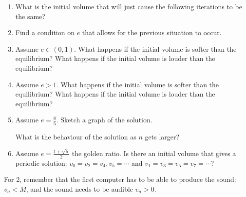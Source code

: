 \begin{exercises}
\begin{problist}
	\begin{enumerate}
		\item What is the initial volume that will just cause the following iterations to be the same?


		\item Find a condition on $e$ that allows for the previous situation to occur.


		\item Assume $e \in (0,1)$. What happens if the initial volume is softer than the equilibrium? What happens if the initial volume is louder than the equilibrium?
		\item Assume $e>1$. What happens if the initial volume is softer than the equilibrium? What happens if the initial volume is louder than the equilibrium?

		\item Assume $e=\frac85$. Sketch a graph of the solution.
		

		What is the behaviour of the solution as $n$ gets larger?
		
		\item Assume $e=\frac{1+\sqrt{5}}{2}$ the golden ratio. Is there an initial volume that gives a periodic solution: $v_0=v_2=v_4,v_5=\cdots$ and $v_1=v_3=v_5=v_7=\cdots$?
	
	\end{enumerate}
	
\begin{annotation}
\begin{goals}
	For 2, remember that the first computer has to be able to produce the sound: $v_n < M$, and the sound needs to be audible $v_n>0$.
\end{goals}	
\end{annotation}


		
	\end{problist}
\end{exercises}